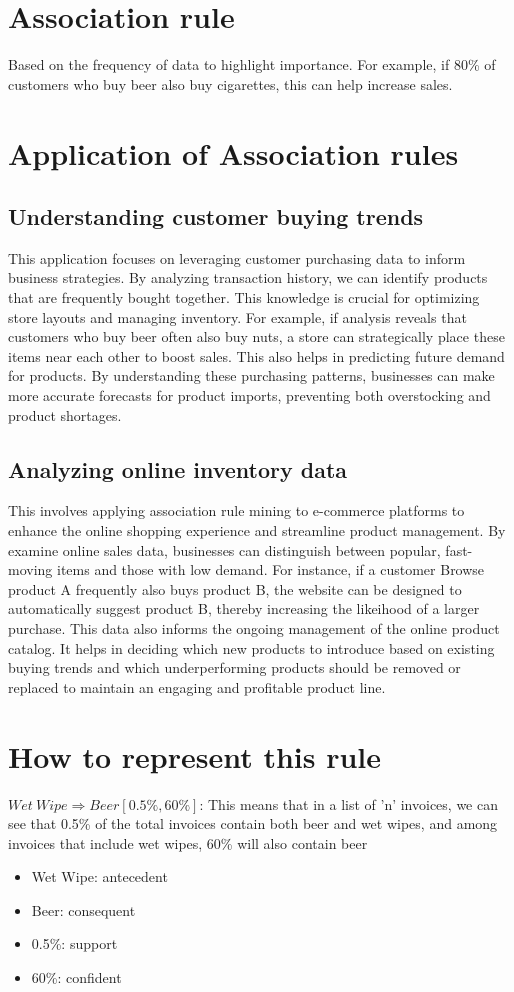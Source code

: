 \section{Association rule}
Based on the frequency of data to highlight importance. For example, if 80\% of customers who buy beer also buy cigarettes, this can help increase sales.
\section{Application of Association rules}

\subsection{Understanding customer buying trends}
This application focuses on leveraging customer purchasing data to inform business strategies. By analyzing transaction history, we can identify products that are frequently bought together. This knowledge is crucial for optimizing store layouts and managing inventory. For example, if analysis reveals that customers who buy beer often also buy nuts, a store can strategically place these items near each other to boost sales. This also helps in predicting future demand for products. By understanding these purchasing patterns, businesses can make more accurate forecasts for product imports, preventing both overstocking and product shortages.
\subsection{Analyzing online inventory data}
This involves applying association rule mining to e-commerce platforms to enhance the online shopping experience and streamline product management. By examine online sales data, businesses can distinguish between popular, fast-moving items and those with low demand. For instance, if a customer Browse product A frequently also buys product B, the website can be designed to automatically suggest product B, thereby increasing the likeihood of a larger purchase. This data also informs the ongoing management of the online product catalog. It helps in deciding which new products to introduce based on existing buying trends and which underperforming products should be removed or replaced to maintain an engaging and profitable product line.

\section{How to represent this rule}
\(Wet~Wipe \Rightarrow Beer [0.5\%, 60\%]\): This means that in a list of 'n' invoices, we can see that 0.5\% of the total invoices contain both beer and wet wipes, and among invoices that include wet wipes, 60\% will also contain beer
\begin{itemize}
    \item Wet Wipe: antecedent
    \item Beer: consequent
    \item 0.5\%: support
    \item 60\%: confident
\end{itemize}
